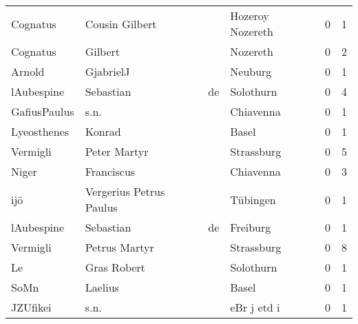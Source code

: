 \begin{center}
\begin{tiny}
\begin{longtabu}{llllrr}
                 Cognatus &                     Cousin Gilbert &             &                            Hozeroy Nozereth &          0 &         1 \\
                 Cognatus &                            Gilbert &             &                                    Nozereth &          0 &         2 \\
                   Arnold &                          GjabrielJ &             &                                     Neuburg &          0 &         1 \\
               lAubespine &                          Sebastian &          de &                                   Solothurn &          0 &         4 \\
             GafiusPaulus &                               s.n. &             &                                   Chiavenna &          0 &         1 \\
              Lyeosthenes &                             Konrad &             &                                       Basel &          0 &         1 \\
                 Vermigli &                       Peter Martyr &             &                                  Strassburg &          0 &         5 \\
                    Niger &                         Franciscus &             &                                   Chiavenna &          0 &         3 \\
                      ijö &            Vergerius Petrus Paulus &             &                                    Tübingen &          0 &         1 \\
               lAubespine &                          Sebastian &          de &                                    Freiburg &          0 &         1 \\
                 Vermigli &                      Petrus Martyr &             &                                  Strassburg &          0 &         8 \\
                       Le &                        Gras Robert &             &                                   Solothurn &          0 &         1 \\
                     SoMn &                            Laelius &             &                                       Basel &          0 &         1 \\
                 JZUfikei &                               s.n. &             &                                 eBr j etd i &          0 &         1 \\

\end{longtabu}
\end{tiny}
\end{center}

